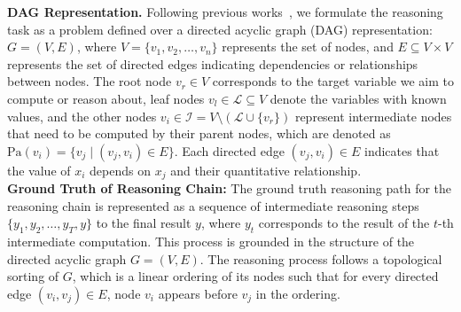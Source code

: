 \label{section: preliminary}
\textbf{DAG Representation.} Following previous works~\citep{zhu2023dyval, zhu2024dynamic, ye2024physics}, we formulate the reasoning task as a problem defined over a directed acyclic graph (DAG) representation: \( G = (V, E) \), where \( V = \{v_1, v_2, \dots, v_n\} \) represents the set of nodes, and \( E \subseteq V \times V \) represents the set of directed edges indicating dependencies or relationships between nodes. The root node \( v_r \in V \) corresponds to the target variable we aim to compute or reason about, leaf nodes \( v_l \in \mathcal{L} \subseteq V \) denote the variables with known values, and the other nodes \( v_i \in \mathcal{I} = V \setminus (\mathcal{L} \cup \{v_r\}) \) represent intermediate nodes that need to be computed by their parent nodes, which are denoted as \( \mathrm{Pa}(v_i) = \{v_j \mid (v_j, v_i) \in E\} \). Each directed edge \( (v_j, v_i) \in E \) indicates that the value of \( x_i \) depends on \( x_j \) and their quantitative relationship.
\\
\textbf{Ground Truth of Reasoning Chain:} The ground truth reasoning path for the reasoning chain is represented as a sequence of intermediate reasoning steps \( \{y_1, y_2, \dots, y_T, y\} \) to the final result \( y \), where \( y_t \) corresponds to the result of the \( t \)-th intermediate computation. This process is grounded in the structure of the directed acyclic graph \( G = (V, E) \). 
The reasoning process follows a topological sorting of \( G \), which is a linear ordering of its nodes such that for every directed edge \( (v_i, v_j) \in E \), node \( v_i \) appears before \( v_j \) in the ordering. 




